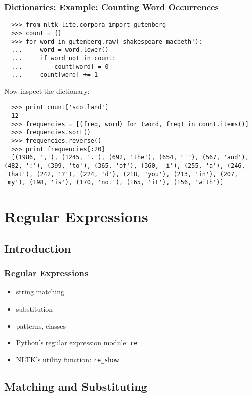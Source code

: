 \documentclass{beamer}             %
\begin{document}
\begin{frame}[fragile]
\frametitle{Dictionaries: Example: Counting Word Occurrences}
\small

\begin{verbatim}
  >>> from nltk_lite.corpora import gutenberg
  >>> count = {}
  >>> for word in gutenberg.raw('shakespeare-macbeth'):
  ...     word = word.lower()
  ...     if word not in count:
  ...         count[word] = 0
  ...     count[word] += 1
\end{verbatim}

Now inspect the dictionary:

\begin{verbatim}
  >>> print count['scotland']
  12
  >>> frequencies = [(freq, word) for (word, freq) in count.items()]
  >>> frequencies.sort()
  >>> frequencies.reverse()
  >>> print frequencies[:20]
  [(1986, ','), (1245, '.'), (692, 'the'), (654, "'"), (567, 'and'), (482, ':'), (399, 'to'), (365, 'of'), (360, 'i'), (255, 'a'), (246, 'that'), (242, '?'), (224, 'd'), (218, 'you'), (213, 'in'), (207, 'my'), (198, 'is'), (170, 'not'), (165, 'it'), (156, 'with')]
\end{verbatim}
\end{frame}

\section{Regular Expressions}

\subsection{Introduction}

\begin{frame}
\frametitle{Regular Expressions}
\begin{itemize}
\item string matching
\item substitution
\item patterns, classes
\item Python's regular expression module: \texttt{re}
\item NLTK's utility function: \texttt{re\_show}
\end{itemize}
\end{frame}

\subsection{Matching and Substituting}
\end{document}
